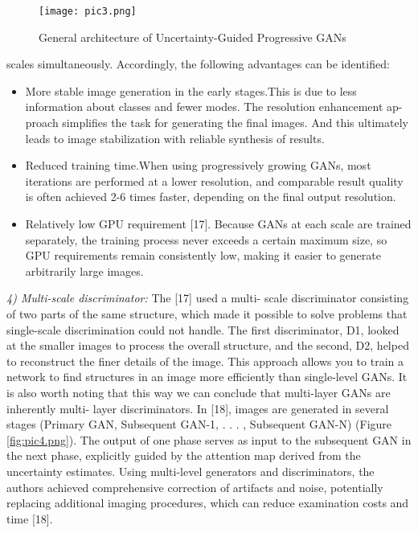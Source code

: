 \documentclass[10pt, a4paper]{article}
\begin{document}
\begin{multicols}{2}
\begin{figure}[H]
    \flushleft
    \texttt{[image: pic3.png]}
    \caption{General architecture of Uncertainty-Guided Progressive GANs
    \label{fig:pic3.png}
}
\end{figure}


\noindent
scales simultaneously. Accordingly, the following advantages can be identified:

\begin{itemize}[left=1em] %
\item More stable image generation in the early stages.This is due to less information about classes and fewer modes. The resolution enhancement ap- proach simplifies the task for generating the final images. And this ultimately leads to image stabilization with reliable synthesis of results.
\item Reduced training time.When using progressively growing GANs, most iterations are performed at a lower resolution, and comparable result quality is often achieved 2-6 times faster, depending on the final output resolution.
\item Relatively low GPU requirement [17]. Because GANs at each scale are trained separately, the training process never exceeds a certain maximum size, so GPU requirements remain consistently low, making it easier to generate arbitrarily large images.
\end{itemize}
\vspace{0.1cm}

\textit{4) Multi-scale discriminator:} The [17] used a multi- scale discriminator consisting of two parts of the same structure, which made it possible to solve problems that single-scale discrimination could not handle. The first discriminator, D1, looked at the smaller images to process the overall structure, and the second, D2, helped to reconstruct the finer details of the image. This approach allows you to train a network to find structures in an image more efficiently than single-level GANs. It is also worth noting that this way we can conclude that multi-layer GANs are inherently multi- layer discriminators. In [18], images are generated in several stages (Primary GAN, Subsequent GAN-1, . . . , Subsequent GAN-N) (Figure \ref{fig:pic4.png}).
The output of one phase serves as input to the subsequent GAN in the next phase, explicitly guided by the attention map derived from the uncertainty estimates. Using multi-level generators and discriminators, the authors achieved comprehensive correction of artifacts and noise, potentially replacing additional imaging procedures, which can reduce examination costs and time [18].


\end{multicols}
\end{document}
